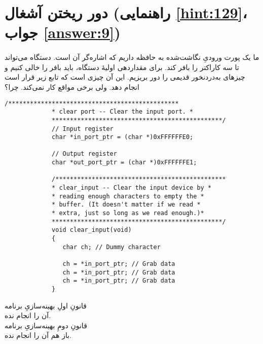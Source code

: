 \section[دور ریختن آشغال]{دور ریختن آشغال \protect{} (راهنمایی \ref{hint:129}، جواب \ref{answer:9})}
\paragraph{}\label{prog:106}
ما یک پورت ورودیِ نگاشت‌شده به حافظه داریم که  اشاره‌گر آن است. دستگاه می‌تواند تا سه کاراکتر را بافر کند. برای مقداردهی اولیهٔ دستگاه، باید بافر را خالی کنیم و چیزهای به‌دردنخور قدیمی را دور بریزیم. این آن چیزی است که تابع زیر قرار است انجام دهد. ولی برخی مواقع کار نمی‌کند. چرا؟

\begin{LTR}
        \begin{lstlisting}[style=C++Style]
             /***********************************************
             * clear port -- Clear the input port. *
             ***********************************************/
             // Input register
             char *in_port_ptr = (char *)0xFFFFFFE0;

             // Output register
             char *out_port_ptr = (char *)0xFFFFFFE1;

             /***********************************************
             * clear_input -- Clear the input device by *
             * reading enough characters to empty the *
             * buffer. (It doesn't matter if we read *
             * extra, just so long as we read enough.)*
             ***********************************************/
             void clear_input(void)
             {
             	char ch; // Dummy character

             	ch = *in_port_ptr; // Grab data
             	ch = *in_port_ptr; // Grab data
             	ch = *in_port_ptr; // Grab data
             }
        \end{lstlisting}
\end{LTR}

\begin{tcolorbox}
    \centering
    قانونِ اولِ بهینه‌سازیِ برنامه\\
    آن را انجام نده.\\
    قانونِ دومِ بهینه‌سازیِ برنامه\\
    باز هم آن را انجام نده.
\end{tcolorbox}
